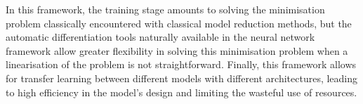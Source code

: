 In this framework, the training stage amounts to solving the minimisation problem classically encountered with classical model reduction methods, but the automatic differentiation tools naturally available in the neural network framework allow greater flexibility in solving this minimisation problem when a linearisation of the problem is not straightforward. 
Finally, this framework allows for transfer learning between different models with different architectures, leading to high efficiency in the model's design and limiting the wasteful use of resources.
